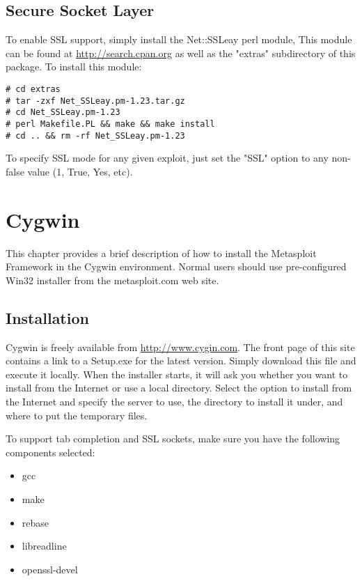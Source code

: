 \documentclass{report}
\begin{document}
	\section{Secure Socket Layer}
	\label{REF-SSL}
\par
To enable SSL support, simply install the Net::SSLeay perl module,
This module can be found at \url{http://search.cpan.org} as well as the
"extras" subdirectory of this package. To install this module:

\begin{verbatim}
# cd extras
# tar -zxf Net_SSLeay.pm-1.23.tar.gz
# cd Net_SSLeay.pm-1.23
# perl Makefile.PL && make && make install
# cd .. && rm -rf Net_SSLeay.pm-1.23
\end{verbatim}

\par
To specify SSL mode for any given exploit, just set the "SSL" option
to any non-false value (1, True, Yes, etc).


\pagebreak
\chapter{Cygwin}
\label{CYGWIN}	
	
\par
This chapter provides a brief description of how to install the Metasploit
Framework in the Cygwin environment. Normal users should use pre-configured
Win32 installer from the metasploit.com web site. 

	\section{Installation}
\par
Cygwin is freely available from \url{http://www.cygin.com}. The front page of
this site contains a link to a Setup.exe for the latest version. Simply
download this file and execute it locally. When the installer starts, it
will ask you whether you want to install from the Internet or use a local
directory. Select the option to install from the Internet and specify the
server to use, the directory to install it under, and where to put the
temporary files.

\par
To support tab completion and SSL sockets, make sure you have the following
components selected:

\begin{itemize}
\item gcc
\item make
\item rebase
\item libreadline
\item openssl-devel
\end{itemize}
\end{document}
